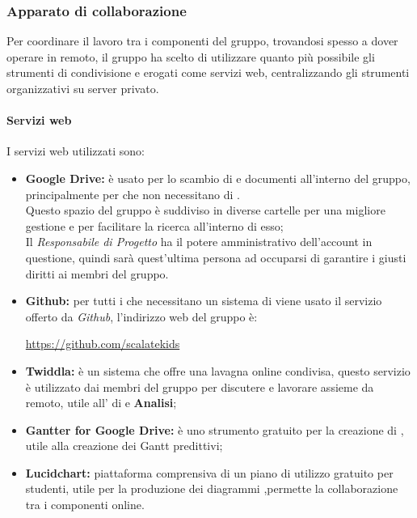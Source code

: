\documentclass{scalatekids-article}
\begin{document}
\subsubsection{Apparato di collaborazione}
Per coordinare il lavoro tra i componenti del gruppo, trovandosi spesso a dover
operare in remoto, il gruppo ha scelto di utilizzare quanto più possibile gli
strumenti di condivisione e  erogati come servizi web,
centralizzando gli strumenti organizzativi su server privato.
\paragraph{Servizi web}
\label{sec:ServiziWeb}
I servizi web utilizzati sono:
\begin{itemize}
\item\textbf{Google Drive:} è usato per lo scambio di  e documenti all'interno del gruppo, principalmente per  che non necessitano di .\\
  Questo spazio del gruppo è suddiviso in diverse cartelle per una migliore gestione e per facilitare la ricerca all'interno di esso;\\
  Il \textit{Responsabile di Progetto} ha il potere amministrativo dell'account in questione, quindi sarà quest'ultima persona ad occuparsi di garantire i giusti diritti ai membri del gruppo.
\item\textbf{Github:} per tutti i  che necessitano un sistema di  viene usato il servizio offerto da \textit{Github}, l'indirizzo web del gruppo è:\\
  \begin{center}
    \url{https://github.com/scalatekids}
  \end{center}
\item\textbf{Twiddla:} è un sistema che offre una lavagna online condivisa, questo servizio è utilizzato dai membri del gruppo per discutere e lavorare assieme da remoto, utile all' di  e \textbf{Analisi};
\item\textbf{Gantter for Google Drive:} è uno strumento gratuito per la creazione di , utile alla creazione dei Gantt predittivi;
\item\textbf{Lucidchart:} piattaforma comprensiva di un piano di utilizzo
  gratuito per studenti, utile per la produzione dei diagrammi
  ,permette la collaborazione tra i componenti online.
\end{itemize}
\end{document}
